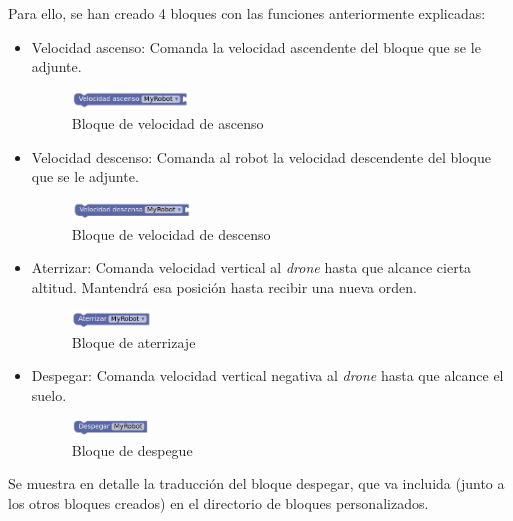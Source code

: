 Para ello, se han creado 4 bloques con las funciones anteriormente explicadas: 
\begin{itemize}
    \item Velocidad ascenso: Comanda la velocidad ascendente del bloque que se le adjunte. 
    \begin{figure}[H]
        \centering
        \includegraphics[width=0.3\textwidth]{img/ascensionBlockly.png}
        \caption{Bloque de velocidad de ascenso} \label{fig:ascension}
    \end{figure}
    
    \item Velocidad descenso: Comanda al robot la velocidad descendente del bloque que se le adjunte. 
    \begin{figure}[H]
        \centering
        \includegraphics[width=0.3\textwidth]{img/descensoBlockly.png}
        \caption{Bloque de velocidad de descenso} \label{fig:descenso}
    \end{figure}
    \item Aterrizar: Comanda velocidad vertical al \textit{drone} hasta que alcance cierta altitud. Mantendrá esa posición hasta recibir una nueva orden.
    \begin{figure}[H]
        \centering
        \includegraphics[width=0.2\textwidth]{img/aterrizarBlockly.png}
        \caption{Bloque de aterrizaje} \label{fig:aterrizaje}
    \end{figure}
    \item Despegar: Comanda velocidad vertical negativa al \textit{drone} hasta que alcance el suelo. 
        \begin{figure}[H]
            \centering
            \includegraphics[width=0.2\textwidth]{img/despegarBlockly.png}
            \caption{Bloque de despegue} \label{fig:despegar}
        \end{figure}
\end{itemize}

 Se muestra en detalle la traducción del bloque despegar, que va incluida (junto a los otros bloques creados) en el directorio de bloques personalizados.


